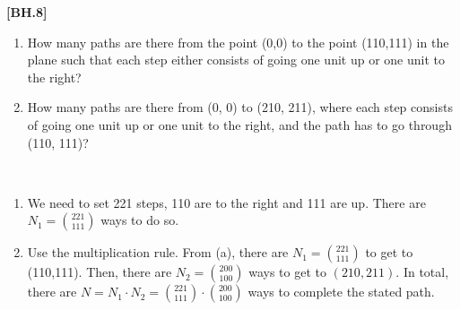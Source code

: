 
\setcounter{theorem}{6}
\begin{exercise}\textbf{[BH.8]}
	\begin{enumerate}
		\item How many paths are there from the point (0,0) to the point (110,111) in the plane such that each step either consists of going one unit up or one unit to the right?
		\item How many paths are there from (0, 0) to (210, 211), where each step consists of going one unit up or one unit to the right, and the path has to go through (110, 111)?
	\end{enumerate}
\begin{solution}~
	\begin{enumerate}
		\item We need to set 221 steps, 110 are to the right and 111 are up. There are $N_{1}={221 \choose 111}$ ways to do so.
		\item Use the multiplication rule. From (a), there are $N_{1}={221 \choose 111}$ to get to (110,111). Then, there are $N_{2}={200 \choose 100}$ ways to get to $(210,211)$. In total, there are $N= N_{1}\cdot N_{2} = {221 \choose 111}\cdot {200 \choose 100}$ ways to complete the stated path.
	\end{enumerate}
\end{solution}
\end{exercise}


